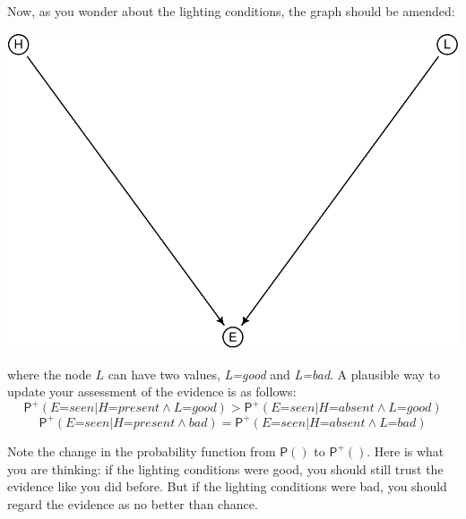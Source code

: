 \documentclass[
  11pt,
  dvipsnames,enabledeprecatedfontcommands]{scrartcl}
\newcommand{\pr}[1]{\ensuremath{\mathsf{P}(#1)}}
\newcommand{\ppr}[2]{\ensuremath{\mathsf{P}^{#1}(#2)}}
\begin{document}
Now, as you wonder about the lighting conditions, the graph should be
amended:

\begin{center}\includegraphics[width=0.5\linewidth,height=0.3\textheight]{ReplyToSteeleStefansson2_files/figure-latex/lighting2DAG-1} \end{center}

\noindent where the node \(L\) can have two values, \textit{L=good} and
\textit{L=bad}. A plausible way to update your assessment of the
evidence is as follows:
\[\ppr{+}{\textit{E=seen} \vert \textit{H=present} \wedge \textit{L=good}} > \ppr{+}{\textit{E=seen} \vert \textit{H=absent} \wedge \textit{L=good}}\]
\[\ppr{+}{\textit{E=seen} \vert \textit{H=present} \wedge \textit{bad}} = \ppr{+}{\textit{E=seen} \vert \textit{H=absent} \wedge \textit{L=bad}}\]

\noindent Note the change in the probability function from \(\pr{}\) to
\(\ppr{+}{}\). Here is what you are thinking: if the lighting conditions
were good, you should still trust the evidence like you did before. But
if the lighting conditions were bad, you should regard the evidence as
no better than chance.
\end{document}
